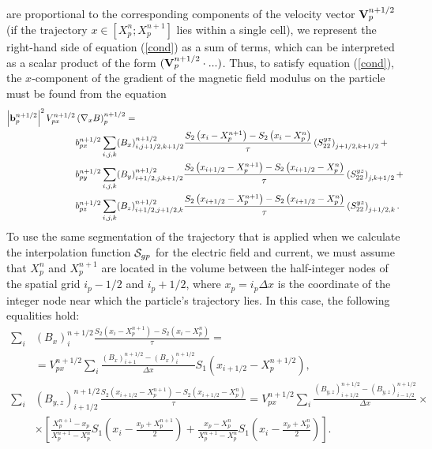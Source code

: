 \documentclass[final,3p]{elsarticle}
\begin{document}
are proportional to the corresponding components of the velocity vector ${\bf V}_p^{n+1/2}$ (if the trajectory $x\in\left[X_p^n;X_p^{n+1}\right]$ lies within a single cell), we represent the right-hand side of equation (\ref{cond}) as a sum of terms, which can be interpreted as a scalar product of the form $({\bf V}_p^{n+1/2}\cdot ...)$. Thus, to satisfy equation (\ref{cond}), the $x$-component of the gradient of the magnetic field modulus on the particle must be found from the equation
\begin{align}
	\left|{\bf b}_p^{n+1/2}\right|^2 V_{px}^{n+1/2}&\left(\nabla_x B\right)_p^{n+1/2}=\nonumber \\
	& b_{px}^{n+1/2}\sum\limits_{i,j,k} (B_x)_{i,j+1/2,k+1/2}^{n+1/2} \frac{S_2\left(x_i-X_p^{n+1}\right)-S_2\left(x_i-X_p^{n}\right)}{\tau} \left(S_{22}^{yz}\right)_{j+1/2,k+1/2}+\nonumber \\
	& b_{py}^{n+1/2}\sum\limits_{i,j,k} (B_y)_{i+1/2,j,k+1/2}^{n+1/2} \frac{S_2\left(x_{i+1/2}-X_p^{n+1}\right)-S_2\left(x_{i+1/2}-X_p^{n}\right)}{\tau} \left(S_{22}^{yz}\right)_{j,k+1/2}+\nonumber \\
	& b_{pz}^{n+1/2}\sum\limits_{i,j,k} (B_z)_{i+1/2,j+1/2,k}^{n+1/2} \frac{S_2\left(x_{i+1/2}-X_p^{n+1}\right)-S_2\left(x_{i+1/2}-X_p^{n}\right)}{\tau} \left(S_{22}^{yz}\right)_{j+1/2,k}. \label{gr}
\end{align}
To use the same segmentation of the trajectory  that is applied when we calculate the interpolation function ${\bf \mathcal{S}}_{gp}$ for the electric field and current, we must assume that $X_p^n$ and $X_p^{n+1}$ are located in the volume between the half-integer nodes of the spatial grid $i_p-1/2$ and $i_{p}+1/2$, where $x_p=i_p\Delta x$ is the coordinate of the integer node near which the particle's trajectory lies. In this case, the following equalities hold:
\begin{align}
	\sum\limits_{i} &(B_x)_i^{n+1/2} \frac{S_2\left(x_i-X_p^{n+1}\right)-S_2\left(x_i-X_p^{n}\right)}{\tau}=\nonumber \\
	&=V_{px}^{n+1/2} \sum\limits_{i} \frac{(B_{x})_{i+1}^{n+1/2}-(B_{x})_{i}^{n+1/2}}{\Delta x} S_1\left(x_{i+1/2}-X_p^{n+1/2}\right), \\
	\sum\limits_{i} &(B_{y,z})_{i+1/2}^{n+1/2} \frac{S_2\left(x_{i+1/2}-X_p^{n+1}\right)-S_2\left(x_{i+1/2}-X_p^{n}\right)}{\tau}=V_{px}^{n+1/2} \sum\limits_{i} \frac{(B_{y,z})_{i+1/2}^{n+1/2}-(B_{y,z})_{i-1/2}^{n+1/2}}{\Delta x}\times\nonumber \\
	&\times\left[\frac{X_p^{n+1}-x_p}{X_p^{n+1}-X_p^n} S_1\left(x_{i}-\frac{x_p+X_p^{n+1}}{2}\right)+\frac{x_p-X_p^{n}}{X_p^{n+1}-X_p^n} S_1\left(x_{i}-\frac{x_p+X_p^{n}}{2}\right)\right].
\end{align}
\end{document}
